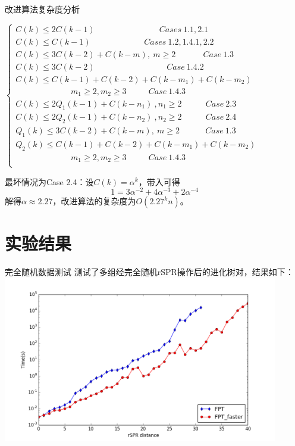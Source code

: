 \documentclass[slidestop,compress,mathserif,red]{beamer}
\begin{document}
\begin{frame}{改进算法复杂度分析}
  \begin{center}
  $\left\{
  \begin{array}{l}
    C(k) \le 2C(k-1) ~~~~~~~~~~~~~~~~~~~~~~~~~~~~~~~~~~~ Cases~1.1,2.1\\
    C(k) \le C(k-1)  ~~~~~~~~~~~~~~~~~~~~~~~~~~~~~ Cases~1.2,1.4.1,2.2\\
    C(k) \le 3C(k-2) + C(k-m),~m \ge 2 ~~~~~~~~~~~~~~~ Case~1.3 \\
    C(k) \le 3C(k-2) ~~~~~~~~~~~~~~~~~~~~~~~~~~~~~~~~~~~~~~~ Case~1.4.2 \\
    C(k) \le C(k-1)+C(k-2) + C(k-m_1) + C(k-m_2)\\
    ~~~~~~~~~~~~~~~~~~~~~~~~~~~~~~ m_1 \ge 2, m_2 \ge 3 ~~~~~~~~~~~~ Case~1.4.3 \\
    C(k) \le 2Q_1(k-1) + C(k-n_1)~,n_1 \ge 2 ~~~~~~~~~~~~~ Case~2.3 \\
    C(k) \le 2Q_2(k-1) + C(k-n_2)~,n_2 \ge 2  ~~~~~~~~~~~~~Case~2.4 \\
    Q_1(k) \le 3C(k-2) + C(k-m),~m \ge 2 ~~~~~~~~~~~~~~ Case~1.3 \\
    Q_2(k) \le C(k-1)+C(k-2) + C(k-m_1) + C(k-m_2)\\
    ~~~~~~~~~~~~~~~~~~~~~~~~~~~~~~ m_1 \ge 2, m_2 \ge 3 ~~~~~~~~~~~~ Case~1.4.3 \\
  \end{array}
  \right.
  $
  \end{center}
  最坏情况为Case 2.4：设$C(k) = \alpha ^ k$，带入可得
  \begin{equation*}
   1 = 3\alpha ^ {-2} + 4\alpha ^ {-3} + 2\alpha ^{-4}
  \end{equation*}
  解得$\alpha \approx 2.27$，改进算法的复杂度为$O(2.27^kn)$。
\end{frame}

\section{实验结果}

\begin{frame}{完全随机数据测试}
测试了多组经完全随机rSPR操作后的进化树对，结果如下：
\includegraphics[width=0.9\textwidth, height=0.7\textheight, keepaspectratio]{./pic/figure_1.png}
\end{frame}
\end{document}
